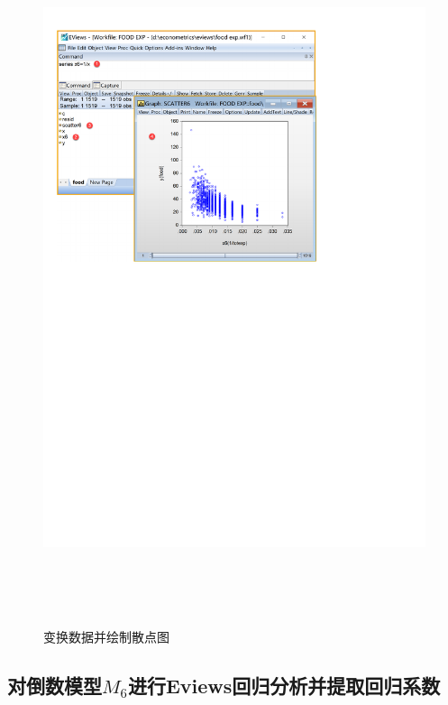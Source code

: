 \documentclass[12pt,(landscape,a4paper),(portrait,a4paper)]{article}
\begin{document}
\begin{figure}

{\centering \includegraphics[width=24.22in,height=8in]{picture/lab3-model-function/scatter6} 

}

\caption{变换数据并绘制散点图}\label{fig:scatter}
\end{figure}

\hypertarget{m_6eviews}{%
\subsection{\texorpdfstring{对倒数模型\(M_6\)进行Eviews回归分析并提取回归系数}{对倒数模型M\_6进行Eviews回归分析并提取回归系数}}\label{m_6eviews}}
\end{document}
